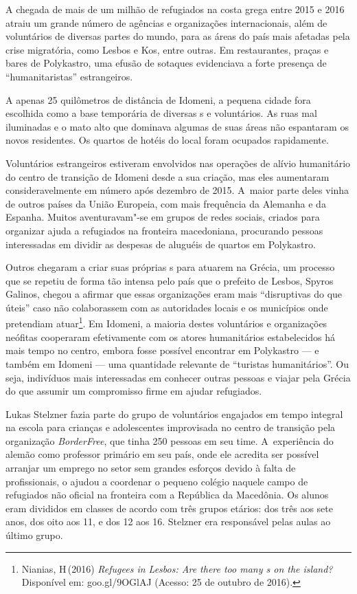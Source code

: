  

A chegada de mais de um milhão de refugiados na costa grega entre 2015 e
2016 atraiu um grande número de agências e organizações internacionais,
além de voluntários de diversas partes do mundo, para as áreas do país
mais afetadas pela crise migratória, como Lesbos e Kos, entre outras. Em
restaurantes, praças e bares de Polykastro, uma efusão de sotaques
evidenciava a forte presença de ``humanitaristas'' estrangeiros.

A apenas 25 quilômetros de distância de Idomeni, a pequena cidade fora
escolhida como a base temporária de diversas s e voluntários. As ruas
mal iluminadas e o mato alto que dominava algumas de suas áreas não
espantaram os novos residentes. Os quartos de hotéis do local foram
ocupados rapidamente.

Voluntários estrangeiros estiveram envolvidos nas operações de alívio
humanitário do centro de transição de Idomeni desde a sua criação, mas
eles aumentaram consideravelmente em número após dezembro de 2015. A~maior parte deles vinha de outros países da União Europeia, com mais
frequência da Alemanha e da Espanha. Muitos aventuravam"-se em grupos de
redes sociais, criados para organizar ajuda a refugiados na fronteira
macedoniana, procurando pessoas interessadas em dividir as despesas de
aluguéis de quartos em Polykastro.

Outros chegaram a criar suas próprias s para atuarem na Grécia, um
processo que se repetiu de forma tão intensa pelo país que o prefeito de
Lesbos, Spyros Galinos, chegou a afirmar que essas organizações eram
mais ``disruptivas do que úteis'' caso não colaborassem com as
autoridades locais e os municípios onde pretendiam
atuar\footnote{ Nianias, H\,(2016) \emph{Refugees in Lesbos: Are
there too many s on the island?} Disponível em:
goo.gl/9OGlAJ
(Acesso: 25 de outubro de 2016).}. Em Idomeni, a maioria destes voluntários e
organizações neófitas cooperaram efetivamente com os atores humanitários
estabelecidos há mais tempo no centro, embora fosse possível encontrar
em Polykastro --- e também em Idomeni --- uma quantidade relevante de
``turistas humanitários''. Ou seja, indivíduos mais interessadas em
conhecer outras pessoas e viajar pela Grécia do que assumir um
compromisso firme em ajudar refugiados.

Lukas Stelzner fazia parte do grupo de voluntários engajados em tempo
integral na escola para crianças e adolescentes improvisada no centro de
transição pela organização \emph{BorderFree}, que tinha 250 pessoas em
seu time. A~experiência do alemão como professor primário em seu país,
onde ele acredita ser possível arranjar um emprego no setor sem grandes
esforços devido à falta de profissionais, o ajudou a coordenar o pequeno
colégio naquele campo de refugiados não oficial na fronteira com a
República da Macedônia. Os alunos eram divididos em classes de acordo
com três grupos etários: dos três aos sete anos, dos oito aos 11, e dos
12 aos 16. Stelzner era responsável pelas aulas ao último grupo.

